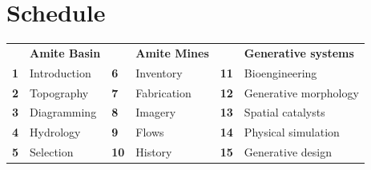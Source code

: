 \documentclass[11pt,article,oneside]{memoir}
\begin{document}
\section{Schedule}
%
\begin{table}[H]
\begin{tabular}{l l @{\hskip 1cm} l l @{\hskip 1cm} l l}
\small
\vspace*{0.25cm}
& \textbf{Amite Basin} && \textbf{Amite Mines}  && \textbf{Generative systems} \\
\textbf{1} & Introduction & \textbf{6} & Inventory & \textbf{11} & Bioengineering \\
\textbf{2} & Topography & \textbf{7} & Fabrication & \textbf{12} & Generative morphology \\
\textbf{3} & Diagramming & \textbf{8} & Imagery & \textbf{13} & Spatial catalysts \\
\textbf{4} & Hydrology & \textbf{9} & Flows & \textbf{14} & Physical simulation \\
\textbf{5} & Selection & \textbf{10} & History & \textbf{15} & Generative design \\
%
\end{tabular}
\end{table}

\end{document}
